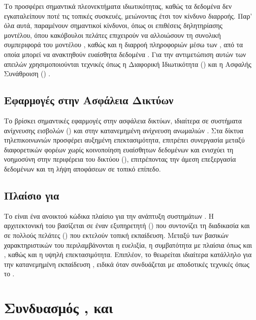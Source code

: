 Το  προσφέρει σημαντικά πλεονεκτήματα ιδιωτικότητας, καθώς τα δεδομένα δεν εγκαταλείπουν ποτέ τις τοπικές συσκευές, μειώνοντας έτσι τον κίνδυνο διαρροής. Παρ’ όλα αυτά, παραμένουν σημαντικοί κίνδυνοι, όπως οι επιθέσεις δηλητηρίασης μοντέλου, όπου κακόβουλοι πελάτες επιχειρούν να αλλοιώσουν τη συνολική συμπεριφορά του μοντέλου \cite{bhagoji2019analyzing}, καθώς και η διαρροή πληροφοριών μέσω των , από τα οποία μπορεί να ανακτηθούν ευαίσθητα δεδομένα \cite{zhu2019deep}. Για την αντιμετώπιση αυτών των απειλών χρησιμοποιούνται τεχνικές όπως η Διαφορική Ιδιωτικότητα () \cite{dwork2014algorithmic} και η Ασφαλής Συνάθροιση () \cite{bonawitz2017practical}.

\subsection{Εφαρμογές στην Ασφάλεια Δικτύων}

Το  βρίσκει σημαντικές εφαρμογές στην ασφάλεια δικτύων, ιδιαίτερα σε συστήματα ανίχνευσης εισβολών () και στην κατανεμημένη ανίχνευση ανωμαλιών \cite{palmos2025privacy}. Στα δίκτυα τηλεπικοινωνιών προσφέρει αυξημένη επεκτασιμότητα, επιτρέπει συνεργασία μεταξύ διαφορετικών φορέων χωρίς κοινοποίηση ευαίσθητων δεδομένων και ενισχύει τη νοημοσύνη στην περιφέρεια του δικτύου (), επιτρέποντας την άμεση επεξεργασία δεδομένων και τη λήψη αποφάσεων σε τοπικό επίπεδο.

\subsection{Πλαίσιο  για }

Το  είναι ένα ανοικτού κώδικα πλαίσιο για την ανάπτυξη συστημάτων  \cite{beutel2020flower}. Η αρχιτεκτονική του βασίζεται σε έναν εξυπηρετητή () που συντονίζει τη διαδικασία και σε πολλούς πελάτες () που εκτελούν τοπική εκπαίδευση. Μεταξύ των βασικών χαρακτηριστικών του περιλαμβάνονται η ευελιξία, η συμβατότητα με πλαίσια όπως  και , καθώς και η υψηλή επεκτασιμότητα. Επιπλέον, το  θεωρείται ιδιαίτερα κατάλληλο για την κατανεμημένη εκπαίδευση , ειδικά όταν συνδυάζεται με αποδοτικές τεχνικές όπως το .

\section{Συνδυασμός ,  και }

